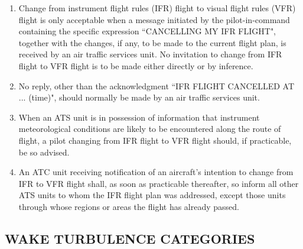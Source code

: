 \documentclass[../vATM.tex]{subfiles}
\begin{document}
    \begin{enumerate}[label=\arabic{section}.\arabic{subsection}.\arabic*]
        \item Change from instrument flight rules (IFR) flight to visual flight rules (VFR) flight is only acceptable when a message initiated by the pilot-in-command containing the specific expression ``CANCELLING MY IFR FLIGHT", together with the changes, if any, to be made to the current flight plan, is received by an air traffic services unit. No invitation to change from IFR flight to VFR flight is to be made either directly or by inference.
        \item No reply, other than the acknowledgment ``IFR FLIGHT CANCELLED AT ... (time)", should normally be made by an air traffic services unit.
        \item When an ATS unit is in possession of information that instrument meteorological conditions are likely to be encountered along the route of flight, a pilot changing from IFR flight to VFR flight should, if practicable, be so advised.


        \item An ATC unit receiving notification of an aircraft's intention to change from IFR to VFR flight shall, as soon as practicable thereafter, so inform all other ATS units to whom the IFR flight plan was addressed, except those units through whose regions or areas the flight has already passed.
    \end{enumerate}

    \subsection[Wake turbulence categories]{WAKE TURBULENCE CATEGORIES}

    \begin{enumempty}[labelindent=\parindent]
        \item {}
    \end{enumempty}
\end{document}
